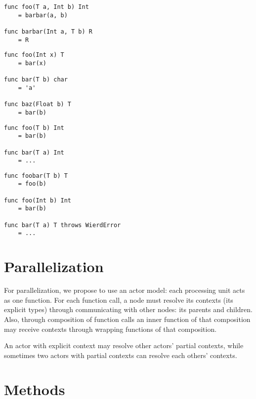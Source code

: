 \documentclass{acm_proc_article-sp}
\begin{document}
\begin{lstlisting}[caption=Explicit Context Provided by Child and Parent,style=paratype]
func foo(T a, Int b) Int
    = barbar(a, b)

func barbar(Int a, T b) R
    = R
\end{lstlisting}

\begin{lstlisting}[caption=Need to Maintain Partial Contexts,style=paratype]
func foo(Int x) T
    = bar(x)

func bar(T b) char
    = 'a'

func baz(Float b) T
    = bar(b)
\end{lstlisting}

\begin{lstlisting}[caption=Unhalting Contexts,style=paratype]
func foo(T b) Int
    = bar(b)

func bar(T a) Int
    = ...
\end{lstlisting}

\begin{lstlisting}[caption=Errors,style=paratype]
func foobar(T b) T
    = foo(b)

func foo(Int b) Int
    = bar(b)

func bar(T a) T throws WierdError
    = ...
\end{lstlisting}


\section{Parallelization}

For parallelization, we propose to use an actor model: each processing unit
acts as one function. For each function call, a node must resolve its contexts
(its explicit types) through communicating with other nodes: its parents and
children. Also, through composition of function calls an inner function of that
composition may receive contexts through wrapping functions of that
composition.

An actor with explicit context may resolve other actors' partial contexts,
while sometimes two actors with partial contexts can resolve each others'
contexts.


\section{Methods}
\end{document}
